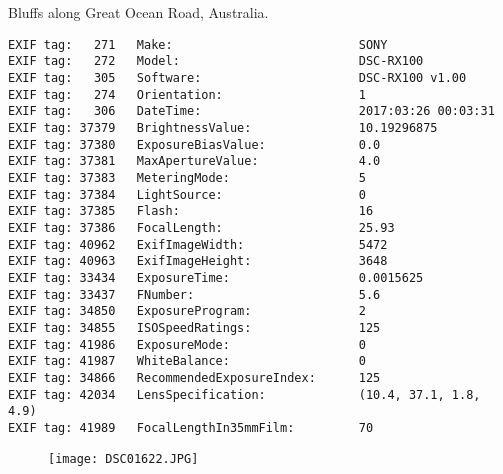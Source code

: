 \section{\protect{}}
\noindent Bluffs along Great Ocean Road, Australia.
\noindent
\begin{lstlisting}
EXIF tag:   271   Make:                          SONY
EXIF tag:   272   Model:                         DSC-RX100
EXIF tag:   305   Software:                      DSC-RX100 v1.00
EXIF tag:   274   Orientation:                   1
EXIF tag:   306   DateTime:                      2017:03:26 00:03:31
EXIF tag: 37379   BrightnessValue:               10.19296875
EXIF tag: 37380   ExposureBiasValue:             0.0
EXIF tag: 37381   MaxApertureValue:              4.0
EXIF tag: 37383   MeteringMode:                  5
EXIF tag: 37384   LightSource:                   0
EXIF tag: 37385   Flash:                         16
EXIF tag: 37386   FocalLength:                   25.93
EXIF tag: 40962   ExifImageWidth:                5472
EXIF tag: 40963   ExifImageHeight:               3648
EXIF tag: 33434   ExposureTime:                  0.0015625
EXIF tag: 33437   FNumber:                       5.6
EXIF tag: 34850   ExposureProgram:               2
EXIF tag: 34855   ISOSpeedRatings:               125
EXIF tag: 41986   ExposureMode:                  0
EXIF tag: 41987   WhiteBalance:                  0
EXIF tag: 34866   RecommendedExposureIndex:      125
EXIF tag: 42034   LensSpecification:             (10.4, 37.1, 1.8, 4.9)
EXIF tag: 41989   FocalLengthIn35mmFilm:         70

\end{lstlisting}
\clearpage
\begin{figure}
\raggedleft
\texttt{[image: DSC01622.JPG]}
\end{figure}


\clearpage
